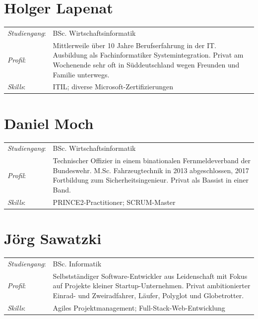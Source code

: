 \documentclass[a4paper,11pt,listof=numbered,glossary=totoc,parskip=half,toc=bib]{scrreprt}
\begin{document}
\section{Holger Lapenat}

\begin{tabularx}{\linewidth}{lX}
\toprule
\textit{Studiengang}: & BSc. Wirtschaftsinformatik\\
\textit{Profil}: & Mittlerweile über 10 Jahre Berufserfahrung in der IT. Ausbildung als Fachinformatiker Systemintegration. Privat am Wochenende sehr oft in Süddeutschland wegen Freunden und Familie unterwegs.
 \\
\textit{Skills}: & ITIL; diverse Microsoft-Zertifizierungen \\
\bottomrule
\end{tabularx}

\section{Daniel Moch}

\begin{tabularx}{\linewidth}{lX}
\toprule
\textit{Studiengang}: & BSc. Wirtschaftsinformatik\\
\textit{Profil}: & Technischer Offizier in einem binationalen Fernmeldeverband der Bundeswehr. M.Sc. Fahrzeugtechnik in 2013 abgeschlossen, 2017 Fortbildung zum Sicherheitsingenieur. Privat als Bassist in einer Band.
 \\
\textit{Skills}: & PRINCE2-Practitioner; SCRUM-Master \\
\bottomrule
\end{tabularx}

\section{Jörg Sawatzki}

\begin{tabularx}{\linewidth}{lX}
\toprule
\textit{Studiengang}: & BSc. Informatik\\
\textit{Profil}: & Selbstständiger Software-Entwickler aus Leidenschaft mit Fokus auf Projekte kleiner Startup-Unternehmen.  Privat ambitionierter Einrad- und Zweiradfahrer, Läufer, Polyglot und Globetrotter. 
 \\
\textit{Skills}: & Agiles Projektmanagement; Full-Stack-Web-Entwicklung \\
\bottomrule
\end{tabularx}
\newpage
\end{document}
